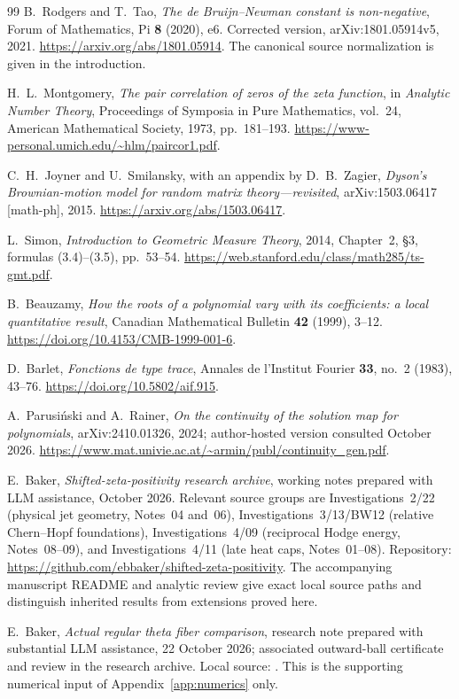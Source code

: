\documentclass[11pt,letterpaper]{article}
\numberwithin{equation}{section}
\theoremstyle{definition}
\theoremstyle{remark}
\begin{document}
\begin{thebibliography}{99}
B.~Rodgers and T.~Tao,
\emph{The de Bruijn--Newman constant is non-negative},
Forum of Mathematics, Pi \textbf{8} (2020), e6.
Corrected version, arXiv:1801.05914v5, 2021.
\url{https://arxiv.org/abs/1801.05914}.
The canonical source normalization is given in the introduction.

H.~L.~Montgomery,
\emph{The pair correlation of zeros of the zeta function},
in \emph{Analytic Number Theory}, Proceedings of Symposia in Pure
Mathematics, vol.~24, American Mathematical Society, 1973, pp.~181--193.
\url{https://www-personal.umich.edu/~hlm/paircor1.pdf}.

C.~H.~Joyner and U.~Smilansky, with an appendix by D.~B.~Zagier,
\emph{Dyson's Brownian-motion model for random matrix theory---revisited},
arXiv:1503.06417 [math-ph], 2015.
\url{https://arxiv.org/abs/1503.06417}.

L.~Simon, \emph{Introduction to Geometric Measure Theory}, 2014,
Chapter~2, \S3, formulas (3.4)--(3.5), pp.~53--54.
\url{https://web.stanford.edu/class/math285/ts-gmt.pdf}.

B.~Beauzamy, \emph{How the roots of a polynomial vary with its
coefficients: a local quantitative result}, Canadian Mathematical
Bulletin \textbf{42} (1999), 3--12.
\url{https://doi.org/10.4153/CMB-1999-001-6}.

D.~Barlet, \emph{Fonctions de type trace}, Annales de l'Institut Fourier
\textbf{33}, no.~2 (1983), 43--76.
\url{https://doi.org/10.5802/aif.915}.

A.~Parusi\'nski and A.~Rainer,
\emph{On the continuity of the solution map for polynomials},
arXiv:2410.01326, 2024; author-hosted version consulted October 2026.
\url{https://www.mat.univie.ac.at/~armin/publ/continuity_gen.pdf}.

E.~Baker, \emph{Shifted-zeta-positivity research archive}, working notes
prepared with LLM assistance, October 2026. Relevant source groups are
Investigations~2/22 (physical jet geometry, Notes~04 and~06),
Investigations~3/13/BW12 (relative Chern--Hopf foundations),
Investigations~4/09 (reciprocal Hodge energy, Notes~08--09), and
Investigations~4/11 (late heat caps, Notes~01--08).
Repository: \url{https://github.com/ebbaker/shifted-zeta-positivity}.
The accompanying manuscript README and analytic review give exact local
source paths and distinguish inherited results from extensions proved here.

E.~Baker, \emph{Actual regular theta fiber comparison},
research note prepared with substantial LLM assistance,
22 October 2026; associated outward-ball certificate and review in
the research archive. Local source:
.
This is the supporting numerical input of Appendix~\ref{app:numerics}
only.
\end{thebibliography}
\end{document}
